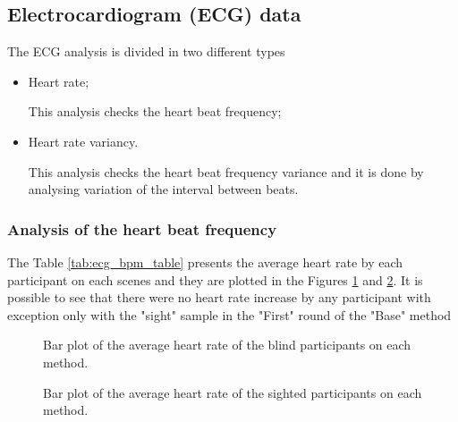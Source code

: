 \subsection{Electrocardiogram (ECG) data}
\label{subsec:results_ecg}

The ECG analysis is divided in two different types

\begin{itemize}
    \item Heart rate;
    
        This analysis checks the heart beat frequency;

    \item Heart rate variancy.
    
        This analysis checks the heart beat frequency variance and it is done by analysing variation of the interval between beats.

\end{itemize}

\subsubsection{Analysis of the heart beat frequency}

The Table \ref{tab:ecg_bpm_table} presents the average heart rate by each participant on each scenes and they are plotted in the Figures \ref{fig:barplot_ecg_bpm_scene_blind} and \ref{fig:barplot_ecg_bpm_scene_sight}. It is possible to see that there were no heart rate increase by any participant with exception only with the "sight" sample in the "First" round of the "Base" method



\begin{figure}[!htb]
    \centering
    \resizebox{0.8\linewidth}{!}{
    
    }
    \caption{Bar plot of the average heart rate of the blind participants on each method.}
    \label{fig:barplot_ecg_bpm_scene_blind}
\end{figure}

\begin{figure}[!htb]
    \centering
    \resizebox{0.6\linewidth}{!}{
        
    }
    \caption{Bar plot of the average heart rate of the sighted participants on each method.}
    \label{fig:barplot_ecg_bpm_scene_sight}
\end{figure}

